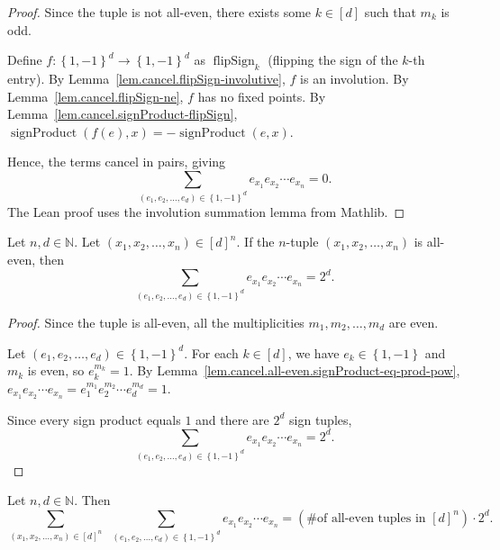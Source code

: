 \begin{proof}
\leanok
Since the tuple is not all-even, there exists some
$k\in\left[  d\right]  $ such that $m_{k}$ is odd.

Define $f:\left\{  1,-1\right\}  ^{d}\rightarrow\left\{  1,-1\right\}  ^{d}$
as $\operatorname{flipSign}_k$ (flipping the sign of the $k$-th entry).
By Lemma~\ref{lem.cancel.flipSign-involutive}, $f$ is an involution.
By Lemma~\ref{lem.cancel.flipSign-ne}, $f$ has no fixed points.
By Lemma~\ref{lem.cancel.signProduct-flipSign},
$\operatorname{signProduct}(f(e), x) = -\operatorname{signProduct}(e, x)$.

Hence, the terms cancel in pairs, giving
\[
\sum_{\left(  e_{1},e_{2},\ldots,e_{d}\right)  \in\left\{  1,-1\right\}  ^{d}%
}e_{x_{1}}e_{x_{2}}\cdots e_{x_{n}}=0.
\]
The Lean proof uses the involution summation lemma from Mathlib.
\end{proof}

\begin{lemma}
\label{lem.cancel.all-even.l2b}
\leanhelper
\leanok
Let $n,d\in\mathbb{N}$. Let $\left(  x_{1}%
,x_{2},\ldots,x_{n}\right)  \in\left[  d\right]  ^{n}$.
If the $n$-tuple $\left(  x_{1},x_{2},\ldots,x_{n}\right)  $ is
all-even, then
\[
\sum_{\left(  e_{1},e_{2},\ldots,e_{d}\right)  \in\left\{  1,-1\right\}  ^{d}%
}e_{x_{1}}e_{x_{2}}\cdots e_{x_{n}}=2^{d}.
\]
\end{lemma}

\begin{proof}
\leanok
Since the tuple is all-even, all the multiplicities $m_{1},m_{2},\ldots,m_{d}$
are even.

Let $\left(  e_{1},e_{2},\ldots,e_{d}\right)  \in\left\{  1,-1\right\}
^{d}$. For each $k\in\left[  d\right]  $, we have $e_{k}\in\left\{  1,-1\right\}  $
and $m_{k}$ is even, so $e_{k}^{m_{k}}=1$.
By Lemma~\ref{lem.cancel.all-even.signProduct-eq-prod-pow},
$e_{x_{1}}e_{x_{2}}\cdots e_{x_{n}} = e_{1}^{m_{1}}e_{2}^{m_{2}}\cdots e_{d}^{m_{d}} = 1$.

Since every sign product equals $1$ and there are $2^d$ sign tuples,
\[
\sum_{\left(  e_{1},e_{2},\ldots,e_{d}\right)  \in\left\{  1,-1\right\}  ^{d}%
}e_{x_{1}}e_{x_{2}}\cdots e_{x_{n}}=2^{d}.
\]
\end{proof}

\begin{lemma}
\label{lem.cancel.sum-signProduct-eq-allEven-count}
\leanhelper
\leanok
Let $n,d\in\mathbb{N}$. Then
\[
\sum_{\left(  x_{1},x_{2},\ldots,x_{n}\right)  \in\left[  d\right]  ^{n}%
}\ \ \sum_{\left(  e_{1},e_{2},\ldots,e_{d}\right)  \in\left\{  1,-1\right\}
^{d}}e_{x_{1}}e_{x_{2}}\cdots e_{x_{n}}
= \left(\text{\# of all-even tuples in } [d]^n\right) \cdot 2^d.
\]
\end{lemma}

